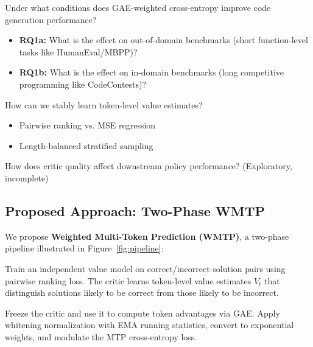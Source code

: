 \begin{description}[style=unboxed,leftmargin=0cm]
    \item[RQ1:] Under what conditions does GAE-weighted cross-entropy improve code generation performance?
    \begin{itemize}[nosep]
        \item \textbf{RQ1a:} What is the effect on out-of-domain benchmarks (short function-level tasks like HumanEval/MBPP)?
        \item \textbf{RQ1b:} What is the effect on in-domain benchmarks (long competitive programming like CodeContests)?
    \end{itemize}

    \item[RQ2:] How can we stably learn token-level value estimates?
    \begin{itemize}[nosep]
        \item Pairwise ranking vs. MSE regression
        \item Length-balanced stratified sampling
    \end{itemize}

    \item[RQ3:] How does critic quality affect downstream policy performance? (Exploratory, incomplete)
\end{description}

\subsection{Proposed Approach: Two-Phase WMTP}

We propose \textbf{Weighted Multi-Token Prediction (WMTP)}, a two-phase pipeline illustrated in Figure~\ref{fig:pipeline}:

\begin{description}[style=unboxed,leftmargin=0cm]
    \item[Phase 1 -- Critic Training:] Train an independent value model on correct/incorrect solution pairs using pairwise ranking loss. The critic learns token-level value estimates $V_t$ that distinguish solutions likely to be correct from those likely to be incorrect.

    \item[Phase 2 -- Weighted Policy Training:] Freeze the critic and use it to compute token advantages via GAE. Apply whitening normalization with EMA running statistics, convert to exponential weights, and modulate the MTP cross-entropy loss.
\end{description}

